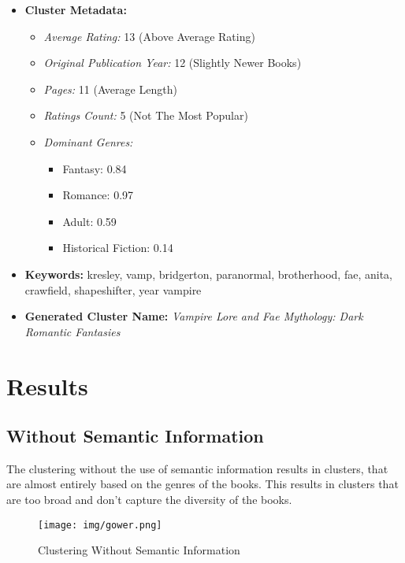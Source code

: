 \documentclass[english]{mvi-report}
\begin{document}
\begin{itemize}
    \item \textbf{Cluster Metadata:}
        \begin{itemize}
            \item \textit{Average Rating:} 13 (Above Average Rating)
            \item \textit{Original Publication Year:} 12 (Slightly Newer Books)
            \item \textit{Pages:} 11 (Average Length)
            \item \textit{Ratings Count:} 5 (Not The Most Popular)
            \item \textit{Dominant Genres:}
                \begin{itemize}
                    \item Fantasy: 0.84
                    \item Romance: 0.97
                    \item Adult: 0.59
                    \item Historical Fiction: 0.14
                \end{itemize}
        \end{itemize}
    \item \textbf{Keywords:} kresley, vamp, bridgerton, paranormal, brotherhood, fae, anita, crawfield, shapeshifter, year vampire
    \item \textbf{Generated Cluster Name:}
\textit{Vampire Lore and Fae Mythology: Dark Romantic Fantasies}
\end{itemize}


\section{Results}
\subsection{Without Semantic Information}
The clustering without the use of semantic information results in clusters, that are almost entirely based on the genres of the books. This results in clusters that are too broad and don't capture the diversity of the books.

\begin{figure}[H]
    \centering
    \texttt{[image: img/gower.png]}
    \caption{Clustering Without Semantic Information}
    \label{fig:without_semantic}
\end{figure}
\end{document}
